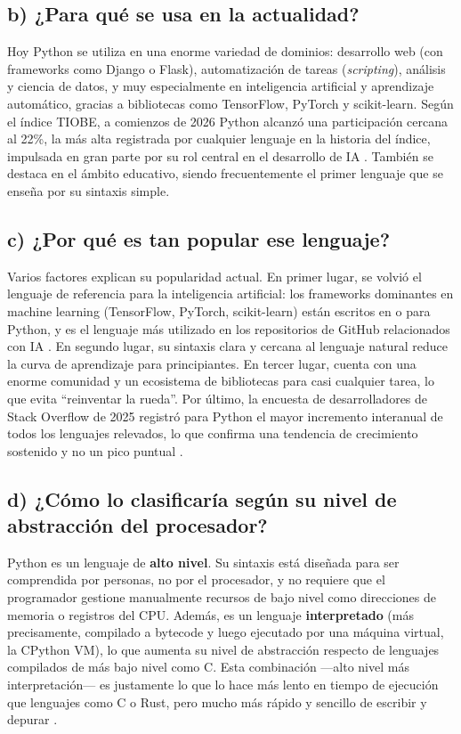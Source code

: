 \documentclass[12pt]{article}
\begin{document}
\subsection*{b) ¿Para qué se usa en la actualidad?}

Hoy Python se utiliza en una enorme variedad de dominios: desarrollo web (con frameworks como Django o Flask), automatización de tareas (\emph{scripting}), análisis y ciencia de datos, y muy especialmente en inteligencia artificial y aprendizaje automático, gracias a bibliotecas como TensorFlow, PyTorch y scikit-learn. Según el índice TIOBE, a comienzos de 2026 Python alcanzó una participación cercana al 22\%, la más alta registrada por cualquier lenguaje en la historia del índice, impulsada en gran parte por su rol central en el desarrollo de IA \parencite{tiobe2026}. También se destaca en el ámbito educativo, siendo frecuentemente el primer lenguaje que se enseña por su sintaxis simple.

\subsection*{c) ¿Por qué es tan popular ese lenguaje?}

Varios factores explican su popularidad actual. En primer lugar, se volvió el lenguaje de referencia para la inteligencia artificial: los frameworks dominantes en machine learning (TensorFlow, PyTorch, scikit-learn) están escritos en o para Python, y es el lenguaje más utilizado en los repositorios de GitHub relacionados con IA \parencite{tiobe2026}. En segundo lugar, su sintaxis clara y cercana al lenguaje natural reduce la curva de aprendizaje para principiantes. En tercer lugar, cuenta con una enorme comunidad y un ecosistema de bibliotecas para casi cualquier tarea, lo que evita \enquote{reinventar la rueda}. Por último, la encuesta de desarrolladores de Stack Overflow de 2025 registró para Python el mayor incremento interanual de todos los lenguajes relevados, lo que confirma una tendencia de crecimiento sostenido y no un pico puntual \parencite{stackoverflow2025}.

\subsection*{d) ¿Cómo lo clasificaría según su nivel de abstracción del procesador?}

Python es un lenguaje de \textbf{alto nivel}. Su sintaxis está diseñada para ser comprendida por personas, no por el procesador, y no requiere que el programador gestione manualmente recursos de bajo nivel como direcciones de memoria o registros del CPU. Además, es un lenguaje \textbf{interpretado} (más precisamente, compilado a bytecode y luego ejecutado por una máquina virtual, la CPython VM), lo que aumenta su nivel de abstracción respecto de lenguajes compilados de más bajo nivel como C. Esta combinación —alto nivel más interpretación— es justamente lo que lo hace más lento en tiempo de ejecución que lenguajes como C o Rust, pero mucho más rápido y sencillo de escribir y depurar \parencite{cairo2005metodologia}.
\end{document}
